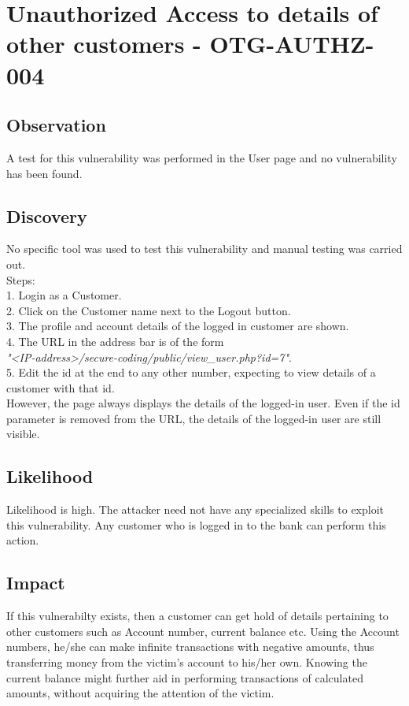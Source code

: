\section{Unauthorized Access to details of other customers - OTG-AUTHZ-004}

\subsection{Observation}
A test for this vulnerability was performed in the User page and no vulnerability has been found.

\subsection{Discovery}
No specific tool was used to test this vulnerability and manual testing was carried out.\\
Steps: \\
1. Login as a Customer. \\
2. Click on the Customer name next to the Logout button. \\
3. The profile and account details of the logged in customer are shown. \\
4. The URL in the address bar is of the form \\ \textit{"<IP-address>/secure-coding/public/view\_user.php?id=7"}. \\
5. Edit the id at the end to any other number, expecting to view details of a customer with that id. \\

However, the page always displays the details of the logged-in user. 
Even if the id parameter is removed from the URL, the details of the logged-in user are still visible.

\subsection{Likelihood}
Likelihood is high.
The attacker need not have any specialized skills to exploit this vulnerability. Any customer who is logged in to the bank can perform this action. 

\subsection{Impact}
If this vulnerabilty exists, then a customer can get hold of details pertaining to other customers such as Account number, current balance etc. Using the Account numbers, he/she can make infinite transactions with negative amounts, thus transferring money from the victim's account to his/her own. Knowing the current balance might further aid in performing transactions of calculated amounts, without acquiring the attention of the victim. 

